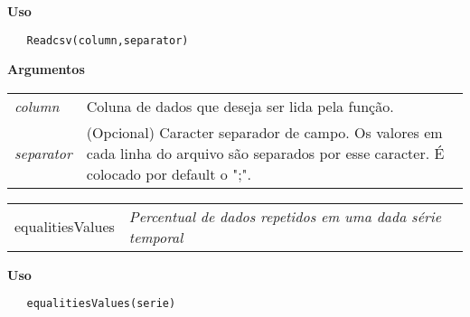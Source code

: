\documentclass[12pt,letterpaper]{article}
\begin{document}
\hrulefill  

\vspace{0.5cm}

\textbf{Uso}

\begin{lstlisting}
   Readcsv(column,separator)
\end{lstlisting}

\vspace{0.5cm}

\textbf{Argumentos}

\begin{table}[!h]
\begin{center}
\begin{tabularx}{\textwidth}{X X}
\hspace{0.5cm} \textit{column} & Coluna de dados que deseja ser lida pela função.\\
\hspace{0.5cm} \textit{separator} & (Opcional) Caracter separador de campo. Os valores em cada linha do arquivo são separados por esse caracter. É colocado por default o ";".\\
\end{tabularx}
\end{center}
\end{table} 



\hrulefill   

\begin{table}[!h]
\begin{center}
\begin{tabularx}{\textwidth}{ X X}
\hspace{0.5cm} equalitiesValues & \textit{Percentual de dados repetidos em uma dada série temporal}\\
\end{tabularx}
\end{center}
\end{table} 

\vspace{-0.5cm}

\hrulefill  

\vspace{0.5cm}

\textbf{Uso}

\begin{lstlisting}
   equalitiesValues(serie)
\end{lstlisting}
\end{document}
